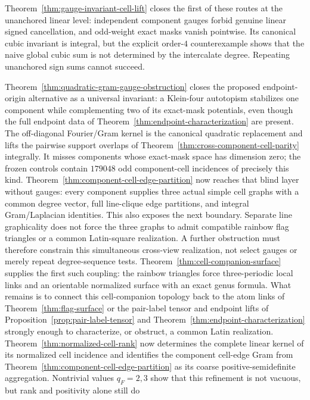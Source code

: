 Theorem~\ref{thm:gauge-invariant-cell-lift} closes the first of these routes
at the unanchored linear level: independent component gauges forbid genuine
linear signed cancellation, and odd-weight exact masks vanish pointwise.  Its
canonical cubic invariant is integral, but the explicit order-$4$
counterexample shows that the naive global cubic sum is not determined by
the intercalate degree.  Repeating unanchored sign sums cannot succeed.

Theorem~\ref{thm:quadratic-gram-gauge-obstruction} closes the proposed
endpoint-origin alternative as a universal invariant: a Klein-four
autotopism stabilizes one component while complementing two of its exact-mask
potentials, even though the full endpoint data of
Theorem~\ref{thm:endpoint-characterization} are present.  The
off-diagonal Fourier/Gram kernel is the canonical quadratic replacement and
lifts the pairwise support overlaps of
Theorem~\ref{thm:cross-component-cell-parity} integrally.  It misses
components whose
exact-mask space has dimension zero; the frozen controls contain $179048$
odd component-cell incidences of precisely this kind.
Theorem~\ref{thm:component-cell-edge-partition} now reaches that blind layer
without gauges: every component supplies three actual simple cell graphs
with a common degree vector, full line-clique edge partitions, and integral
Gram/Laplacian identities.  This also exposes the next boundary.  Separate
line graphicality does not force the three graphs to admit compatible
rainbow flag triangles or a common Latin-square realization.  A further
obstruction must therefore constrain this simultaneous cross-view
realization, not select gauges or merely repeat degree-sequence tests.
Theorem~\ref{thm:cell-companion-surface} supplies the first such coupling:
the rainbow triangles force three-periodic local links and an orientable
normalized surface with an exact genus formula.  What remains is to connect
this cell-companion topology back to the atom links of
Theorem~\ref{thm:flag-surface} or the pair-label tensor and endpoint lifts of
Proposition~\ref{prop:pair-label-tensor} and
Theorem~\ref{thm:endpoint-characterization} strongly enough to characterize,
or obstruct, a common Latin
realization.
Theorem~\ref{thm:normalized-cell-rank} now determines the complete linear
kernel of its normalized cell incidence and identifies the component
cell-edge Gram from Theorem~\ref{thm:component-cell-edge-partition} as its
coarse positive-semidefinite aggregation.  Nontrivial values $q_F=2,3$ show
that this refinement is not vacuous, but rank and positivity alone still do
